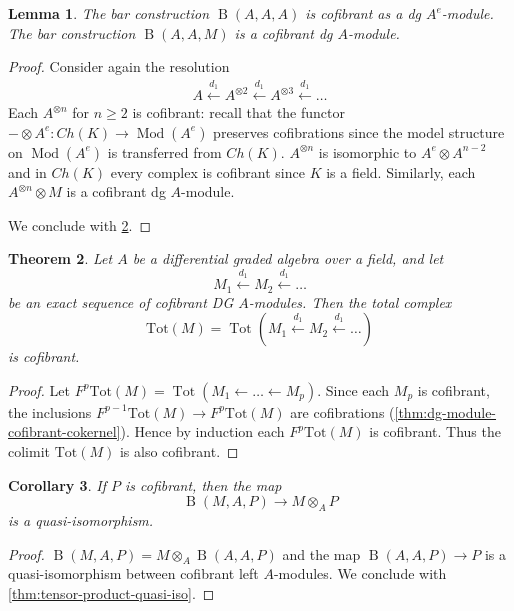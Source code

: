 \documentclass{scrartcl}
\theoremstyle{plain}
\newtheorem{theorem}{Theorem}[section]
\newtheorem{corollary}[theorem]{Corollary}
\newtheorem{lemma}[theorem]{Lemma}
\theoremstyle{definition}
\DeclareMathOperator{\Tot}{Tot}
\newcommand{\from}{\leftarrow}
\let\xfrom\xleftarrow
\DeclareMathOperator{\Mod}{Mod}
\DeclareMathOperator{\BC}{B}
\newcommand{\blank}{-}
\begin{document}
\begin{lemma}\label{lem:bar-cofibrant}
    The bar construction $\BC(A, A, A)$ is cofibrant as a dg $A^e$-module. The bar construction $\BC(A, A, M)$ is a cofibrant dg $A$-module.
\end{lemma}
\begin{proof}
    Consider again the resolution
    \begin{align*}
        A \xfrom{d_1} A^{\otimes 2} \xfrom{d_1} A^{\otimes 3} \xfrom{d_1} \dots
    \end{align*}
    Each $A^{\otimes n}$ for $n\geq 2$ is cofibrant: recall that the functor $\blank\otimes A^e\colon Ch(K)\to \Mod(A^e)$ preserves cofibrations since the model structure on $\Mod(A^e)$ is transferred from $Ch(K)$. $A^{\otimes n}$ is isomorphic to $A^e \otimes A^{n-2}$ and in $Ch(K)$ every complex is cofibrant since $K$ is a field. Similarly, each $A^{\otimes n}\otimes M$ is a cofibrant dg $A$-module.

    We conclude with \cref{prop:cofibrant-resolution-dga-mod}. 
\end{proof}

\begin{theorem}\label{prop:cofibrant-resolution-dga-mod}
    Let $A$ be a differential graded algebra over a field, and let $$M_1\xfrom{d_1} M_2\xfrom{d_1}\dots$$ be an exact sequence of cofibrant DG $A$-modules. Then the total complex $$\mathrm{Tot}(M)=\Tot(M_1\xfrom{d_1} M_2\xfrom{d_1} \dots)$$ is cofibrant.
\end{theorem}

\begin{proof}
    Let $F^p\mathrm{Tot}(M) = \Tot(M_1\from\dots\from M_p)$. Since each $M_p$ is cofibrant, the inclusions $F^{p-1}\mathrm{Tot}(M) \to F^p\mathrm{Tot}(M)$ are cofibrations (\ref{thm:dg-module-cofibrant-cokernel}). Hence by induction each $F^p\mathrm{Tot}(M)$ is cofibrant. Thus the colimit $\mathrm{Tot}(M)$ is also cofibrant. 
\end{proof}


\begin{corollary}\label{cor:bar-construction-is-derived-tensor-product}
    If $P$ is cofibrant, then the map $$\BC(M, A, P)\to M\otimes_A P$$
    is a quasi-isomorphism. 
\end{corollary}
\begin{proof}
    $\BC(M, A, P) = M\otimes_A \BC(A, A, P)$ and the map $\BC(A, A, P)\to P$ is a quasi-isomorphism between cofibrant left $A$-modules. We conclude with \cref{thm:tensor-product-quasi-iso}. 
\end{proof}
\end{document}
